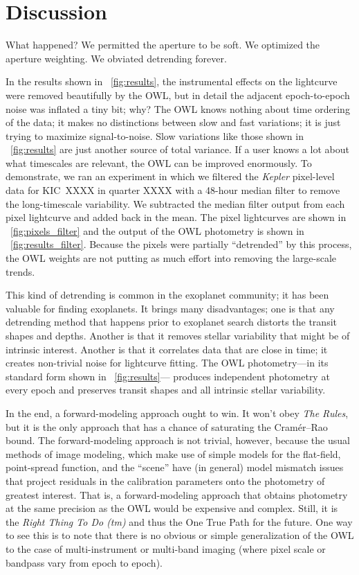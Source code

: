 \documentclass[12pt, letterpaper, preprint]{aastex}
\newcommand{\project}[1]{\textsl{#1}}
\begin{document}
\section{Discussion}

What happened?
We permitted the aperture to be soft.
We optimized the aperture weighting.
We obviated detrending forever.

In the results shown in \figurename~\ref{fig:results},
  the instrumental effects on the lightcurve were removed beautifully by the OWL,
  but in detail
  the adjacent epoch-to-epoch noise was inflated a tiny bit;
  why?
The OWL knows nothing about time ordering of the data;
  it makes no distinctions between slow and fast variations;
  it is just trying to maximize signal-to-noise.
Slow variations like those shown in \figurename~\ref{fig:results}
  are just another source of total variance.
If a user knows a lot about what timescales are relevant,
  the OWL can be improved enormously.
To demonstrate, we ran an experiment in which we filtered the \project{Kepler} pixel-level data
  for KIC~XXXX in quarter XXXX
  with a 48-hour median filter to remove the long-timescale variability.
We subtracted the median filter output from each pixel lightcurve and added back in the mean.
The pixel lightcurves are shown in \figurename~\ref{fig:pixels_filter}
  and the output of the OWL photometry is shown in \figurename~\ref{fig:results_filter}.
Because the pixels were partially ``detrended'' by this process,
  the OWL weights are not putting as much effort into removing the large-scale trends.

This kind of detrending is common in the exoplanet community;
  it has been valuable for finding exoplanets.
It brings many disadvantages;
  one is that any detrending method that happens prior to exoplanet search
  distorts the transit shapes and depths.
Another is that it removes stellar variability that might be of intrinsic interest.
Another is that it correlates data that are close in time;
  it creates non-trivial noise for lightcurve fitting.
The OWL photometry---in its standard form shown in \figurename~\ref{fig:results}---%
  produces independent photometry at every epoch
  and preserves transit shapes and all intrinsic stellar variability.

In the end, a forward-modeling approach ought to win.
It won't obey \emph{The Rules}, but it is the only approach that has a chance
  of saturating the Cram\'er--Rao bound.
The forward-modeling approach is not trivial, however,
  because the usual methods of image modeling,
  which make use of simple models for the flat-field, point-spread function,
  and the ``scene''
  have (in general) model mismatch issues that project residuals
  in the calibration parameters onto the photometry of greatest interest.
That is, a forward-modeling approach that obtains photometry at the same
  precision as the OWL would be expensive and complex.
Still, it is the \emph{Right Thing To Do (tm)} and thus the One True Path for the future.
One way to see this is to note that there is no obvious or simple generalization of the OWL
  to the case of multi-instrument or multi-band imaging
  (where pixel scale or bandpass vary from epoch to epoch).
\end{document}
